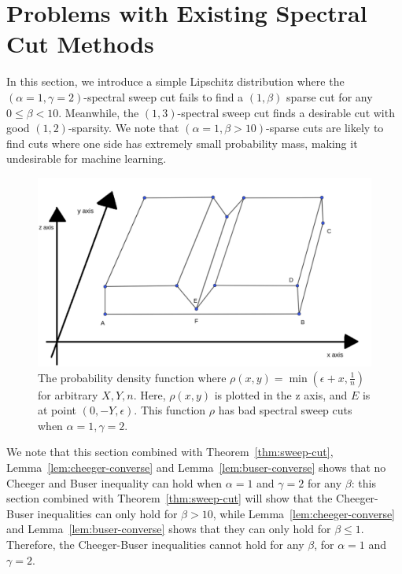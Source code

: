 \section{Problems with Existing Spectral Cut
Methods}\label{sec:counterexample}

In this section, we introduce a simple Lipschitz distribution
where the $(\alpha=1, \gamma=2)$-spectral sweep cut fails to find a
$(1, \beta)$ sparse cut for any $0 \leq  \beta < 10$. Meanwhile, the
$(1,3)$-spectral sweep cut finds a desirable cut with good
$(1,2)$-sparsity. We note that $(\alpha=1, \beta > 10)$-sparse cuts are
likely to find cuts where one side has extremely small probability mass,
making it undesirable for machine learning. 

\begin{figure}[H]
\centering
\includegraphics[width=4.5in]{spectralcluster/images/counterexample.png}
\caption{
  The probability density function where $\rho(x, y) =
    \min(\epsilon + x, \frac{1}{n})$ for arbitrary $X, Y, n$.
      Here, $\rho(x,y)$ is plotted in the z axis, and $E$ is at point
      $(0, -Y, \epsilon)$. This function $\rho$ has bad spectral sweep
      cuts when $\alpha = 1, \gamma = 2$.
 }
\label{fig:counterexample}
\end{figure}

We note that this
section combined with Theorem~\ref{thm:sweep-cut},
Lemma~\ref{lem:cheeger-converse} and Lemma~\ref{lem:buser-converse} shows that no Cheeger and Buser
inequality can hold when $\alpha = 1$ and $\gamma = 2$ for any
$\beta$: this section combined with Theorem~\ref{thm:sweep-cut} will
show that the Cheeger-Buser inequalities can only hold for $\beta > 10$,
while Lemma~\ref{lem:cheeger-converse} and Lemma~\ref{lem:buser-converse} shows that they can only hold for
$\beta \leq 1$. Therefore, the Cheeger-Buser inequalities cannot hold for
any $\beta$, for $\alpha = 1$ and $\gamma = 2$.

